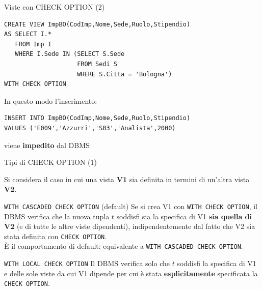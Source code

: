 \documentclass[aspectratio=169]{beamer}
\begin{document}
\begin{frame}[fragile]{Viste con CHECK OPTION (2)}

\begin{lstlisting}
CREATE VIEW ImpBO(CodImp,Nome,Sede,Ruolo,Stipendio)
AS SELECT I.*
   FROM Imp I
   WHERE I.Sede IN (SELECT S.Sede
                    FROM Sedi S
                    WHERE S.Citta = 'Bologna')
WITH CHECK OPTION
\end{lstlisting}

\vspace{10pt}
In questo modo l'inserimento:

\begin{lstlisting}
INSERT INTO ImpBO(CodImp,Nome,Sede,Ruolo,Stipendio)
VALUES ('E009','Azzurri','S03','Analista',2000)
\end{lstlisting}

\begin{alertblock}{}
\centering viene \textbf{impedito} dal DBMS
\end{alertblock}

\end{frame}

\begin{frame}{Tipi di CHECK OPTION (1)}

Si considera il caso in cui una vista \textbf{V1} sia definita in termini di un'altra vista \textbf{V2}.

\vspace{8pt}
\begin{block}{\texttt{WITH CASCADED CHECK OPTION} (default)}
Se si crea V1 con \texttt{WITH CHECK OPTION}, il DBMS verifica che la nuova tupla $t$ soddisfi sia la specifica di V1 \textbf{sia quella di V2} (e di tutte le altre viste dipendenti), indipendentemente dal fatto che V2 sia stata definita con \texttt{CHECK OPTION}.\\
\vspace{4pt}
È il comportamento di default: equivalente a \texttt{WITH CASCADED CHECK OPTION}.
\end{block}

\vspace{6pt}
\begin{block}{\texttt{WITH LOCAL CHECK OPTION}}
Il DBMS verifica solo che $t$ soddisfi la specifica di V1 e delle sole viste da cui V1 dipende per cui è stata \textbf{esplicitamente} specificata la \texttt{CHECK OPTION}.
\end{block}

\end{frame}
\end{document}
